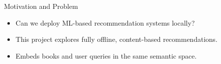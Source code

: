 
\begin{frame}{Motivation and Problem}
\begin{itemize}
  \item Can we deploy ML-based recommendation systems locally?
  \item This project explores fully offline, content-based recommendations.
  \item Embeds books and user queries in the same semantic space.
\end{itemize}
\end{frame}
